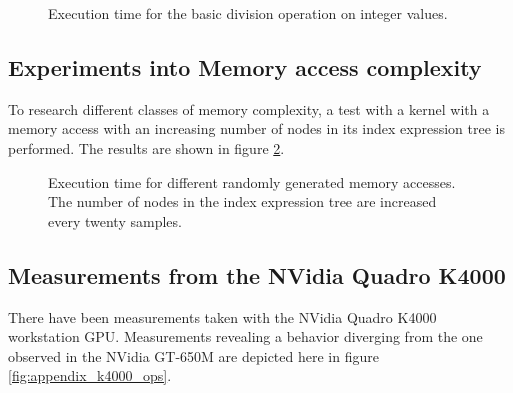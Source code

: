 \begin{figure}[p]
	\begin{center}
		\caption{Execution time for the basic division operation on integer values.}
		\label{fig:model_ops_single_int_div}
	\end{center}
\end{figure}

\subsection{Experiments into Memory access complexity}
To research different classes of memory complexity, a test with a kernel with a memory access with an increasing number of nodes in its index expression tree is performed. The results are shown in figure \ref{fig:model_access_complexity_test}. 

\begin{figure}[p]
	\begin{center}
		\caption{Execution time for different randomly generated memory accesses. The number of nodes in the index expression tree are increased every twenty samples.}
		\label{fig:model_access_complexity_test}
	\end{center}
\end{figure}

\subsection{Measurements from the NVidia Quadro K4000}
There have been measurements taken with the NVidia Quadro K4000 workstation GPU. Measurements revealing a behavior diverging from the one observed in the NVidia GT-650M are depicted here in figure \ref{fig:appendix_k4000_ops}.

